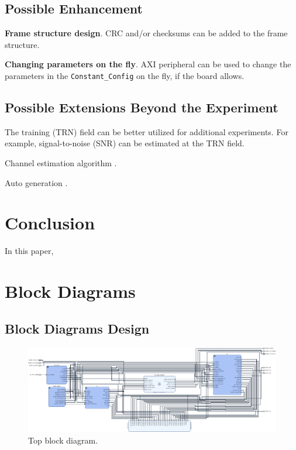 \documentclass[journal,twoside]{IEEEtran}
\begin{document}
    \subsection{Possible Enhancement}

      \textbf{Frame structure design}.
      CRC and/or checksums can be added to the frame structure.

      \textbf{Changing parameters on the fly}.
      AXI peripheral \cite{xilinx:pg127} can be used to change the parameters in the \texttt{Constant\_Config} on the fly,
      if the board allows.

    \subsection{Possible Extensions Beyond the Experiment}

      The training (TRN) field can be better utilized for additional experiments.
      For example, signal-to-noise (SNR) can be estimated at the TRN field.

      Channel estimation algorithm \cite{zhao2023ompl,you2023beam}.

      Auto generation \cite{zhao2023automatic}.

  \section{Conclusion}

    In this paper,


  \appendices

  \section{Block Diagrams}

    \subsection{Block Diagrams Design}

      \begin{figure}
        \includegraphics[width=\linewidth]{../schematic/top.pdf}
        \caption{Top block diagram.}
      \end{figure}
\end{document}
